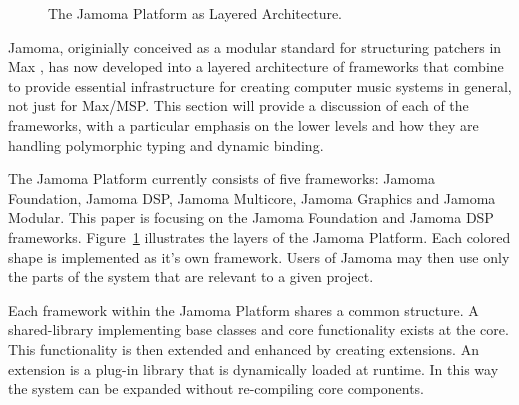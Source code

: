 \documentclass[twoside,10pt]{article}
\begin{document}
\begin{figure}[htbp]
\centerline{}
\caption{The Jamoma Platform as Layered Architecture.}
\label{fig:layers}
\end{figure}

Jamoma, originially conceived as a modular standard for structuring patchers in Max \cite{Place:2006}, has now developed into a layered architecture of frameworks that combine to provide essential infrastructure for creating computer music systems in general, not just for Max/MSP. This section will provide a discussion of each of the frameworks, with a particular emphasis on the lower levels and how they are handling polymorphic typing and dynamic binding.

  
The Jamoma Platform currently consists of five frameworks: Jamoma Foundation, Jamoma DSP, Jamoma Multicore, Jamoma Graphics and Jamoma Modular. This paper is focusing on the Jamoma Foundation and Jamoma DSP frameworks. Figure~\ref{fig:layers} illustrates the layers of the Jamoma Platform.  Each colored shape is implemented as it's own framework. Users of Jamoma may then use only the parts of the system that are relevant to a given project.  

Each framework within the Jamoma Platform shares a common structure.  A shared-library implementing base classes and core functionality exists at the core.  This functionality is then extended and enhanced by creating extensions.  An extension is a plug-in library that is dynamically loaded at runtime.  In this way the system can be expanded without re-compiling core components.
\end{document}

